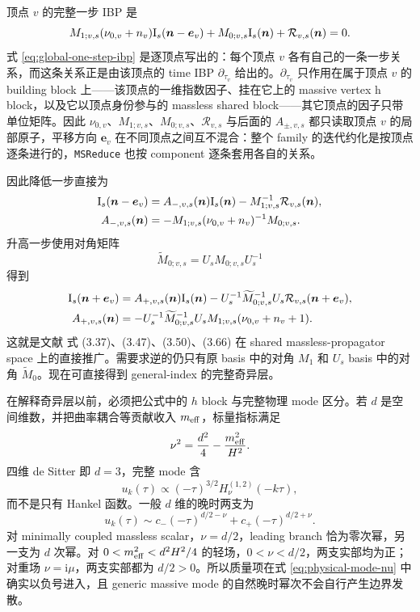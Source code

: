 \documentclass[11pt,a4paper]{ctexart}
\newcommand{\ii}{\mathrm i}
\newcommand{\cR}{\mathcal R}
\begin{document}
顶点 $v$ 的完整一步 IBP 是
\begin{equation}
 M_{1;v,s}(\nu_{0,v}+n_v)\bm{\text I}_s(\bm n-\bm e_v)
 +M_{0;v,s}\bm{\text I}_s(\bm n)
 +\cR_{v,s}(\bm n)=0.
 \label{eq:global-one-step-ibp}
\end{equation}
式 \eqref{eq:global-one-step-ibp} 是逐顶点写出的：每个顶点 $v$ 各有自己的一条一步关系，而这条关系正是由该顶点的 time IBP $\partial_{\tau_v}$ 给出的。$\partial_{\tau_v}$ 只作用在属于顶点 $v$ 的 building block 上——该顶点的一维指数因子、挂在它上的 massive vertex h block，以及它以顶点身份参与的 massless shared block——其它顶点的因子只带单位矩阵。因此 $\nu_{0,v}$、$M_{1;v,s}$、$M_{0;v,s}$、$\cR_{v,s}$ 与后面的 $A_{\pm,v,s}$ 都只读取顶点 $v$ 的局部原子，平移方向 $\bm e_v$ 在不同顶点之间互不混合：整个 family 的迭代约化是按顶点逐条进行的，\texttt{MSReduce} 也按 component 逐条套用各自的关系。

因此降低一步直接为
\begin{align}
 \bm{\text I}_s(\bm n-\bm e_v)
 &=A_{-,v,s}(\bm n)\bm{\text I}_s(\bm n)
 -M_{1;v,s}^{-1}\cR_{v,s}(\bm n),\\
 A_{-,v,s}(\bm n)
 &=-M_{1;v,s}(\nu_{0,v}+n_v)^{-1}M_{0;v,s}.
 \label{eq:global-Aminus}
\end{align}
升高一步使用对角矩阵
\begin{equation}
 \widetilde M_{0;v,s}=U_sM_{0;v,s}U_s^{-1}
\end{equation}
得到
\begin{align}
 \bm{\text I}_s(\bm n+\bm e_v)
 &=A_{+,v,s}(\bm n)\bm{\text I}_s(\bm n)
 -U_s^{-1}\widetilde M_{0;v,s}^{-1}U_s
 \cR_{v,s}(\bm n+\bm e_v),\\
 A_{+,v,s}(\bm n)
 &=-U_s^{-1}\widetilde M_{0;v,s}^{-1}U_s
 M_{1;v,s}(\nu_{0,v}+n_v+1).
 \label{eq:global-Aplus}
\end{align}
这就是文献 \cite{Chen:2023eic} 式 (3.37)、(3.47)、(3.50)、(3.66) 在 shared massless-propagator space 上的直接推广。需要求逆的仍只有原 basis 中的对角 $M_1$ 和 $U_s$ basis 中的对角 $\widetilde M_0$。现在可直接得到 general-index 的完整奇异层。

在解释奇异层以前，必须把公式中的 $h$ block 与完整物理 mode 区分。若 $d$ 是空间维数，并把曲率耦合等贡献收入 $m_{\rm eff}$，标量指标满足
\begin{equation}
 \nu^2=\frac{d^2}{4}-\frac{m_{\rm eff}^2}{H^2}.
 \label{eq:physical-mode-nu}
\end{equation}
四维 de Sitter 即 $d=3$，完整 mode 含
\begin{equation}
 u_k(\tau)\propto(-\tau)^{3/2}H_\nu^{(1,2)}(-k\tau),
 \label{eq:physical-mode-full-power}
\end{equation}
而不是只有 Hankel 函数。一般 $d$ 维的晚时两支为
\begin{equation}
 u_k(\tau)\sim c_-(-\tau)^{d/2-\nu}
 +c_+(-\tau)^{d/2+\nu}.
 \label{eq:physical-late-time-branches}
\end{equation}
对 minimally coupled massless scalar，$\nu=d/2$，leading branch 恰为零次幂，另一支为 $d$ 次幂。对 $0<m_{\rm eff}^2<d^2H^2/4$ 的轻场，$0<\nu<d/2$，两支实部均为正；对重场 $\nu=\ii\mu$，两支实部都为 $d/2>0$。所以质量项在式 \eqref{eq:physical-mode-nu} 中确实以负号进入，且 generic massive mode 的自然晚时幂次不会自行产生边界发散。
\end{document}
